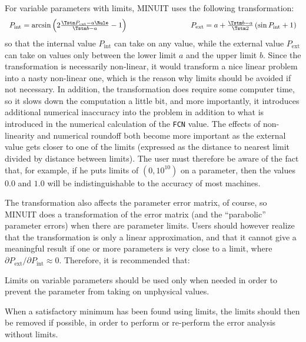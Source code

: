 For variable parameters with limits, MINUIT uses the following transformation:
\[
\begin{array}{l@{\hspace{3cm}}l}
P_{\mathrm{int}} = \arcsin
        \left( 2 \frac{\Tstm P_{\mathrm{ext}}-a\Rule}{\Tstm b-a} - 1 \right)       &
P_{\mathrm{ext}} = a + \frac{\Tstm b - a}{\Tstm 2}
        \left( \sin P_{\mathrm{int}} + 1 \right)                  \\
\end{array}
\]
so that the internal value \(P_{\mathrm{int}}\) can take on any value, while
the external value \(P_{\mathrm{ext}}\) can take on values only between the lower
limit \(a\) and the upper limit \(b\).
Since the transformation is necessarily non-linear, it would transform a
nice linear problem into a nasty non-linear one, which is the reason why
limits should be avoided if not necessary. 
In addition, the transformation
does require some computer time, so it slows down the computation a little
bit, and more importantly, it introduces additional numerical inaccuracy into
the problem in addition to what is introduced in the numerical calculation
of the \texttt{FCN} value.  
The effects of non-linearity and numerical roundoff both
become more important as the external value gets closer to one of the limits
(expressed as the distance to nearest limit divided by distance between limits).
The user must therefore be aware of the fact that, for example,
if he puts limits of \((0,10^{10})\) on a parameter, then the values \(0.0\) 
and \(1.0\) will be indistinguishable to the accuracy of most machines.

The transformation also affects the parameter error matrix, of course,
so MINUIT does a transformation of the error matrix (and the 
``parabolic'' parameter errors) when there are parameter limits.
Users should however realize that the transformation is only a linear
approximation, and that it cannot give a meaningful result if one or more
parameters is very close to a limit, where
\(\partial P_{\mathrm{ext}} / \partial P_{\mathrm{int}} \approx 0\).
Therefore, it is recommended that:
\begin{UL}
\item Limits on variable parameters should be used only when needed in order
to prevent the parameter from taking on unphysical values.
\item When a satisfactory minimum has been found using limits, the limits
should then be removed if possible, in order to perform or re-perform the
error analysis without limits.
\end{UL}

